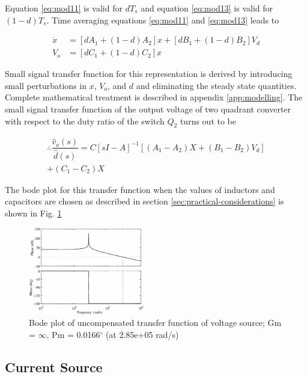 \documentclass[a4paper]{IEEEtran}
\begin{document}
	Equation \eqref{eq:mod11} is valid for $dT_s$ and equation \eqref{eq:mod13} is valid for $(1-d)T_s$. Time averaging equations \eqref{eq:mod11} and \eqref{eq:mod13} leads to

	\begin{equation}
		\begin{split}
			\dot{x} &= [dA_1+(1-d)A_2]x + [dB_1 + (1-d)B_2]V_d\\
			V_o &= [dC_1+(1-d)C_2]x
		\end{split}
		\label{eq:mod14}
	\end{equation}

	Small signal transfer function for this representation is derived by introducing small perturbations in $x$, $V_o$, and $d$ and eliminating the steady state quantities. Complete mathematical treatment is described in appendix \ref{app:modelling}. The small signal transfer function of the output voltage of two quadrant converter with respect to the duty ratio of the switch $Q_2$ turns out to be

	\begin{multline}
		\therefore \dfrac{\hat{v}_o(s)}{\hat{d}(s)} = C[sI-A]^{-1}[(A_1-A_2)X+(B_1-B_2)V_d]\\+(C_1-C_2)X
		\label{eq:mod27a}
	\end{multline}

	The bode plot for this transfer function when the values of inductors and capacitors are chosen as described in section \ref{sec:practical-considerations} is shown in Fig. \ref{fig:uncomp-vs}

	\begin{figure}
		\centering
		\includegraphics[width=0.45\textwidth]{uncompensated-vs}
		\caption{Bode plot of uncompensated transfer function of voltage source; Gm = $\infty$,  Pm = 0.0166$^\circ$ (at 2.85e+05 rad/s)}
		\label{fig:uncomp-vs}
	\end{figure}

\subsection{Current Source}
\end{document}
